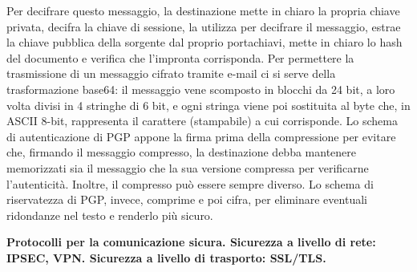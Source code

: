 \documentclass[answers, a4paper, 11pt]{exam}
\begin{document}
\begin{questions}
\begin{parts}
\begin{solution}
\begin{enumerate}
\end{enumerate}
Per decifrare questo messaggio, la destinazione mette in chiaro la propria chiave privata, decifra la chiave di sessione, la utilizza per decifrare il messaggio, estrae la chiave pubblica della sorgente dal proprio portachiavi, mette in chiaro lo hash del documento e verifica che l'impronta corrisponda.
Per permettere la trasmissione di un messaggio cifrato tramite e-mail ci si serve della trasformazione base64: il messaggio vene scomposto in blocchi da 24 bit, a loro volta divisi in 4 stringhe di 6 bit, e ogni stringa viene poi sostituita al byte che, in ASCII 8-bit, rappresenta il carattere (stampabile) a cui corrisponde.
Lo schema di autenticazione di PGP appone la firma prima della compressione per evitare che, firmando il messaggio compresso, la destinazione debba mantenere memorizzati sia il messaggio che la sua versione compressa per verificarne l'autenticità.
Inoltre, il compresso può essere sempre diverso.
Lo schema di riservatezza di PGP, invece, comprime e poi cifra, per eliminare eventuali ridondanze nel testo e renderlo più sicuro.
\end{solution}
\end{parts}
\question \textbf{Protocolli per la comunicazione sicura. Sicurezza a livello di rete: IPSEC, VPN. Sicurezza a livello di trasporto: SSL/TLS.}
\begin{parts}

\end{parts}
\end{questions}
\end{document}
